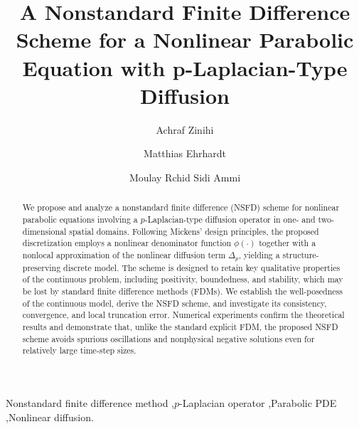 \documentclass[final,12pt,3p]{elsarticle}
\theoremstyle{plain}
\theoremstyle{definition}
\theoremstyle{remark}
\begin{document}
\begin{frontmatter}

\title{A Nonstandard Finite Difference Scheme for 
a Nonlinear Parabolic Equation with p-Laplacian-Type Diffusion}

\author[BUW,MAIS]{Achraf Zinihi}

\author[BUW]{Matthias Ehrhardt}

\author[MAIS]{Moulay Rchid Sidi Ammi}

\address[BUW]{University of Wuppertal, Applied and Computational Mathematics,\\
Gaußstrasse 20, 42119 Wuppertal, Germany}

\address[MAIS]{Department of Mathematics, AMNEA Group, Faculty of Sciences and Techniques,\\
Moulay Ismail University of Meknes, Errachidia 52000, Morocco}


\begin{abstract}
We propose and analyze a nonstandard finite difference (NSFD) scheme for nonlinear parabolic equations involving a $p$-Laplacian-type diffusion operator in one- and two-dimensional spatial domains. 
Following Mickens’ design principles, the proposed discretization employs a nonlinear denominator function $\phi(\cdot)$ together with a nonlocal approximation of the nonlinear diffusion term $\Delta_p$, yielding a structure-preserving discrete model. 
The scheme is designed to retain key qualitative properties of the continuous problem, including positivity, boundedness, and stability, which may be lost by standard finite difference methods (FDMs). 
We establish the well-posedness of the continuous model, derive the NSFD scheme, and investigate its consistency, convergence, and local truncation error. 
Numerical experiments confirm the theoretical results and demonstrate that, unlike the standard explicit FDM, the proposed NSFD scheme avoids spurious oscillations and nonphysical negative solutions even for relatively large time-step sizes.
\end{abstract}

\begin{keyword}
Nonstandard finite difference method \sep $p$-Laplacian operator \sep Parabolic PDE \sep Nonlinear diffusion.


\end{keyword}
\end{frontmatter}
\end{document}
